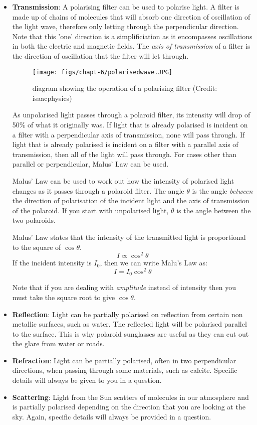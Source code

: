 \documentclass[revision-guide.tex]{subfiles}
\begin{document}
\begin{itemize}
\item\textbf{Transmission}: A polarising filter can be used to polarise light. A filter is made up of chains of molecules that will absorb one direction of oscillation of the light wave, therefore only letting through the perpendicular direction. Note that this 'one' direction is a simplificiation as it encompasses oscillations in both the electric and magnetic fields. The \emph{axis of transmission} of a filter is the direction of oscillation that the filter will let through.

\begin{figure}[h]
\texttt{[image: figs/chapt-6/polarisedwave.JPG]}
\centering
\caption{diagram showing the operation of a polarising filter (Credit: isaacphysics)}
\end{figure}

As unpolarised light passes through a polaroid filter, its intensity will drop of 50\% of what it originally was. If light that is already polarised is incident on a filter with a perpendicular axis of transmission, none will pass through. If light that is already polarised is incident on a filter with a parallel axis of transmission, then all of the light will pass through. For cases other than parallel or perpendicular, Malus' Law can be used.

Malus' Law can be used to work out how the intensity of polarised light changes as it passes through a polaroid filter. The angle $\theta$ is the angle \emph{between} the direction of polarisation of the incident light and the axis of transmission of the polaroid. If you start with unpolarised light, $\theta$ is the angle between the two polaroids.

Malus' Law states that the intensity of the transmitted light is proportional to the square of $\cos\theta$.
$$I \propto \cos^2\theta $$
If the incident intensity is $I_0$, then we can write Malu's Law as:
$$I = I_0\cos^2\theta$$

Note that if you are dealing with \emph{amplitude} instead of intensity then you must take the square root to give $\cos\theta$.

\item\textbf{Reflection}: Light can be partially polarised on reflection from certain non metallic surfaces, such as water. The reflected light will be polarised parallel to the surface. This is why polaroid sunglasses are useful as they can cut out the glare from water or roads.

\item\textbf{Refraction}: Light can be partially polarised, often in two perpendicular directions, when passing through some materials, such as calcite. Specific details will always be given to you in a question.

\item\textbf{Scattering}: Light from the Sun scatters of molecules in our atmosphere and is partially polarised depending on the direction that you are looking at the sky. Again, specific details will always be provided in a question.

\end{itemize}
\end{document}

